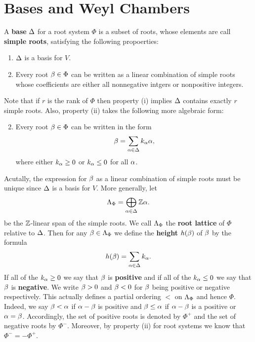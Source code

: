 \documentclass[12pt,reqno,oneside]{amsart}
\begin{document}
\section{Bases and Weyl Chambers}
    A \textbf{base} $\Delta$ for a root system $\Phi$ is a subset of roots, whose elements are call \textbf{simple roots}, satisfying the following propoerties:

    \begin{enumerate}[label=(\roman*)]
        \item $\Delta$ is a basis for $V$.
        \item Every root $\beta \in \Phi$ can be written as a linear combination of simple roots whose coefficients are either all nonnegative intgers or nonpositive integers.
    \end{enumerate}

    Note that if $r$ is the rank of $\Phi$ then property (i) implies $\Delta$ contains exactly $r$ simple roots. Also, property (ii) takes the following more algebraic form:

    \begin{enumerate}[label=(\roman*)]
        \setcounter{enumi}{1}
        \item Every root $\beta \in \Phi$ can be written in the form
        \[
            \beta = \sum_{\alpha \in \Delta}k_{\alpha}\alpha,
        \]
        where either $k_{\alpha} \ge 0$ or $k_{\alpha} \le 0$ for all $\alpha$.
    \end{enumerate}

    Acutally, the expression for $\beta$ as a linear combination of simple roots must be unique since $\Delta$ is a basis for $V$. More generally, let
    \[
        \Lambda_{\Phi} = \bigoplus_{\alpha \in \Delta}\mathbb{Z}\alpha.
    \]
    be the $\mathbb{Z}$-linear span of the simple roots. We call $\Lambda_{\Phi}$ the \textbf{root lattice} of $\Phi$ relative to $\Delta$. Then for any $\beta \in \Lambda_{\Phi}$ we define the \textbf{height} $h(\beta)$ of $\beta$ by the formula
    \[
        h(\beta) = \sum_{\alpha \in \Delta}k_{\alpha}.
    \]
    If all of the $k_{\alpha} \ge 0$ we say that $\beta$ is \textbf{positive} and if all of the $k_{\alpha} \le 0$ we say that $\beta$ is \textbf{negative}. We write $\beta > 0$ and $\beta < 0$ for $\beta$ being positive or negative respectively. This actually defines a partial ordering $<$ on $\Lambda_{\Phi}$ and hence $\Phi$. Indeed, we say $\beta < \alpha$ if $\alpha-\beta$ is positive and $\beta \le \alpha$ if $\alpha-\beta$ is a positive or $\alpha = \beta$. Accordingly, the set of positive roots is denoted by $\Phi^{+}$ and the set of negative roots by $\Phi^{-}$. Moreover, by property (ii) for root systems we know that $\Phi^{-} = -\Phi^{+}$.
\end{document}
